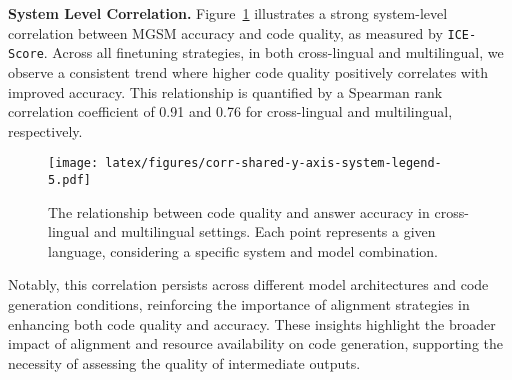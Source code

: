 



\textbf{System Level Correlation.}  Figure~\ref{fig:sys-level-assoc} illustrates a strong system-level correlation between MGSM accuracy and code quality, as measured by \texttt{ICE-Score}.
%
Across all finetuning strategies, in both cross-lingual and multilingual, we observe a consistent trend where higher code quality positively correlates with improved accuracy.
%
This relationship is quantified by a Spearman rank correlation coefficient of 0.91 and 0.76 for cross-lingual and multilingual, respectively.
%
%
\begin{figure}[htbp]
    \centering
    \texttt{[image: latex/figures/corr-shared-y-axis-system-legend-5.pdf]}
    \caption{The relationship between code quality and answer accuracy in cross-lingual and multilingual settings. Each point represents a given language, considering a specific system and model combination.
    }
    \label{fig:sys-level-assoc}
\end{figure}


Notably, this correlation persists across different model architectures and code generation conditions, reinforcing the importance of alignment strategies in enhancing both code quality and accuracy. 
%
These insights highlight the broader impact of alignment and resource availability on code generation, supporting the necessity of assessing the quality of intermediate outputs.



